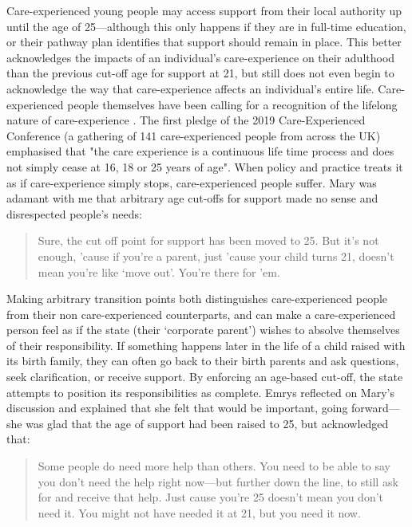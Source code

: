 Care-experienced young people may access support from their local authority up until the age of 25—although this only happens if they are in full-time education, or their pathway plan identifies that support should remain in place.  This better acknowledges the impacts of an individual’s care-experience on their adulthood than the previous cut-off age for support at 21, but still does not even begin to acknowledge the way that care-experience affects an individual's entire life.  Care-experienced people themselves have been calling for a recognition of the lifelong nature of care-experience \citep{the_care_experienced_conference_research_2019}. The first pledge of the 2019 Care-Experienced Conference (a gathering of 141 care-experienced people from across the UK) emphasised that "the care experience is a continuous life time process and does not simply cease at 16, 18 or 25 years of age". When policy and practice treats it as if care-experience simply stops, care-experienced people suffer. Mary was adamant with me that arbitrary age cut-offs for support made no sense and disrespected people's needs:
\begin{quote}
Sure, the cut off point for support has been moved to 25. But it's not enough, 'cause if you're a parent, just 'cause your child turns 21, doesn't mean you're like `move out'. You're there for 'em.
\end{quote}
Making arbitrary transition points both distinguishes care-experienced people from their non care-experienced counterparts, and can make a care-experienced person feel as if the state (their ‘corporate parent’) wishes to absolve themselves of their responsibility. If something happens later in the life of a child raised with its birth family, they can often go back to their birth parents and ask questions, seek clarification, or receive support. By enforcing an age-based cut-off, the state attempts to position its responsibilities as complete. Emrys reflected on Mary's discussion and explained that she felt that would be important, going forward—she was glad that the age of support had been raised to 25, but acknowledged that:
\begin{quote}
Some people do need more help than others. You need to be able to say you don't need the help right now—but further down the line, to still ask for and receive that help. Just cause you're 25 doesn't mean you don't need it. You might not have needed it at 21, but you need it now.
\end{quote}
